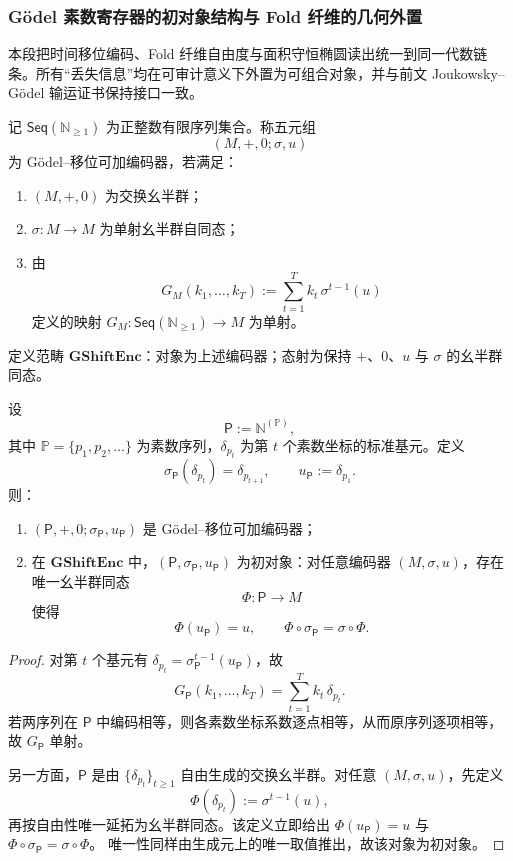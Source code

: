 \subsubsection{Gödel 素数寄存器的初对象结构与 Fold 纤维的几何外置}\label{subsubsec:group-jg-prime-register-fold-gap-ellipse}

本段把时间移位编码、Fold 纤维自由度与面积守恒椭圆读出统一到同一代数链条。所有“丢失信息”均在可审计意义下外置为可组合对象，并与前文 Joukowsky--Gödel 输运证书保持接口一致。

\begin{definition}\label{def:group-jg-godel-shift-additive-encoder}
记 \(\mathsf{Seq}(\mathbb{N}_{\ge 1})\) 为正整数有限序列集合。称五元组
\[
(M,+,0;\sigma,u)
\]
为 Gödel--移位可加编码器，若满足：
\begin{enumerate}
  \item \((M,+,0)\) 为交换幺半群；
  \item \(\sigma:M\to M\) 为单射幺半群自同态；
  \item 由
  \[
  G_M(k_1,\dots,k_T):=\sum_{t=1}^{T} k_t\,\sigma^{t-1}(u)
  \]
  定义的映射
  \(
  G_M:\mathsf{Seq}(\mathbb{N}_{\ge 1})\to M
  \)
  为单射。
\end{enumerate}
定义范畴 \(\mathbf{GShiftEnc}\)：对象为上述编码器；态射为保持 \(+\)、\(0\)、\(u\) 与 \(\sigma\) 的幺半群同态。
\end{definition}

\begin{theorem}\label{thm:group-jg-prime-register-initial-object}
设
\[
\mathsf{P}:=\mathbb{N}^{(\mathbb{P})},
\]
其中 \(\mathbb{P}=\{p_1,p_2,\dots\}\) 为素数序列，\(\delta_{p_t}\) 为第 \(t\) 个素数坐标的标准基元。定义
\[
\sigma_{\mathsf P}(\delta_{p_t})=\delta_{p_{t+1}},
\qquad
u_{\mathsf P}:=\delta_{p_1}.
\]
则：
\begin{enumerate}
  \item \((\mathsf{P},+,0;\sigma_{\mathsf P},u_{\mathsf P})\) 是 Gödel--移位可加编码器；
  \item 在 \(\mathbf{GShiftEnc}\) 中，\((\mathsf{P},\sigma_{\mathsf P},u_{\mathsf P})\) 为初对象：对任意编码器 \((M,\sigma,u)\)，存在唯一幺半群同态
  \[
  \Phi:\mathsf{P}\to M
  \]
  使得
  \[
  \Phi(u_{\mathsf P})=u,\qquad
  \Phi\circ\sigma_{\mathsf P}=\sigma\circ\Phi.
  \]
\end{enumerate}
\end{theorem}
\begin{proof}
对第 \(t\) 个基元有 \(\delta_{p_t}=\sigma_{\mathsf P}^{t-1}(u_{\mathsf P})\)，故
\[
G_{\mathsf P}(k_1,\dots,k_T)=\sum_{t=1}^{T}k_t\,\delta_{p_t}.
\]
若两序列在 \(\mathsf{P}\) 中编码相等，则各素数坐标系数逐点相等，从而原序列逐项相等，故 \(G_{\mathsf P}\) 单射。

另一方面，\(\mathsf{P}\) 是由 \(\{\delta_{p_t}\}_{t\ge 1}\) 自由生成的交换幺半群。对任意 \((M,\sigma,u)\)，先定义
\[
\Phi(\delta_{p_t}):=\sigma^{t-1}(u),
\]
再按自由性唯一延拓为幺半群同态。该定义立即给出
\(
\Phi(u_{\mathsf P})=u
\)
与
\(
\Phi\circ\sigma_{\mathsf P}=\sigma\circ\Phi
\)。
唯一性同样由生成元上的唯一取值推出，故该对象为初对象。
\end{proof}

